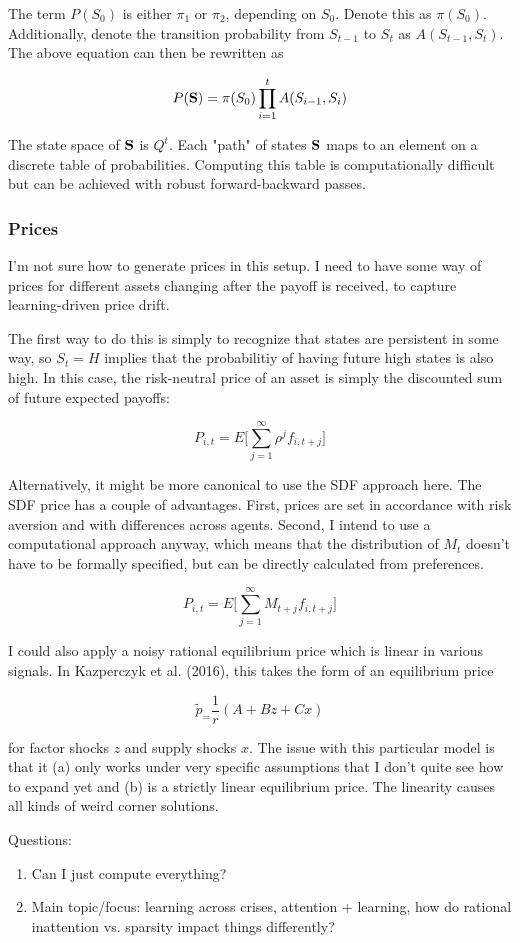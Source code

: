 \documentclass{article}
\begin{document}
The term $P(S_0)$ is either $\pi_1$ or $\pi_2$, depending on $S_0$. Denote this as $\pi(S_0)$. Additionally, denote the transition probability from $S_{t-1}$ to $S_t$ as $A(S_{t-1}, S_t)$. The above equation can then be rewritten as

\begin{align*}
    P(\mathbf{S}) = \pi(S_0) \prod_{i=1}^t A(S_{i-1}, S_{i})
\end{align*}

The state space of $\mathbf{S}$ is $Q^t$. Each "path" of states $\mathbf{S}$ maps to an element on a discrete table of probabilities. Computing this table is computationally difficult but can be achieved with robust forward-backward passes.

\subsubsection*{Prices}

I'm not sure how to generate prices in this setup. I need to have some way of prices for different assets changing after the payoff is received, to capture learning-driven price drift.

The first way to do this is simply to recognize that states are persistent in some way, so $S_t = H$ implies that the probabilitiy of having future high states is also high. In this case, the risk-neutral price of an asset is simply the discounted sum of future expected payoffs:

$$
P_{i,t} = E\Bigg[\sum_{j=1}^\infty \rho^{j} f_{i,t+j} \Bigg]
$$

Alternatively, it might be more canonical to use the SDF approach here. The SDF price has a couple of advantages. First, prices are set in accordance with risk aversion and with differences across agents. Second, I intend to use a computational approach anyway, which means that the distribution of $M_t$ doesn't have to be formally specified, but can be directly calculated from preferences.

$$
P_{i,t} = E\Bigg[\sum_{j=1}^\infty M_{t+j} f_{i,t+j} \Bigg]
$$

I could also apply a noisy rational equilibrium price which is linear in various signals. In Kazperczyk et al. (2016), this takes the form of an equilibrium price

$$
\tilde p_ = \frac{1}{r}(A + Bz + Cx)
$$

\noindent for factor shocks $z$ and supply shocks $x$. The issue with this particular model is that it (a) only works under very specific assumptions that I don't quite see how to expand yet and (b) is a strictly linear equilibrium price. The linearity causes all kinds of weird corner solutions. 

Questions:

\begin{enumerate}
    \item Can I just compute everything?
    \item Main topic/focus: learning across crises, attention + learning, how do rational inattention vs. sparsity impact things differently?
\end{enumerate}
\end{document}
